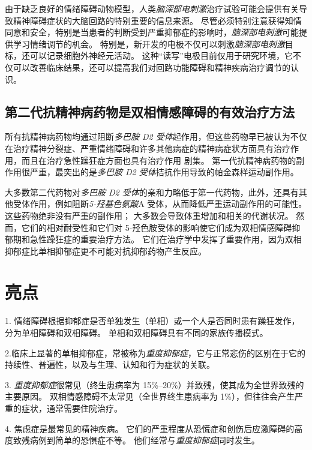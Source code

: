 由于缺乏良好的情绪障碍动物模型，人类\textit{脑深部电刺激}治疗试验可能会提供有关导致精神障碍症状的大脑回路的特别重要的信息来源。
尽管必须特别注意获得知情同意和安全，特别是当患者的判断受到严重抑郁症的影响时，\textit{脑深部电刺激}可能提供学习情绪调节的机会。
特别是，新开发的电极不仅可以刺激\textit{脑深部电刺激}目标，还可以记录细胞外神经元活动。
这种“读写”电极目前仅用于研究环境，它不仅可以改善临床结果，还可以提高我们对回路功能障碍和精神疾病治疗调节的认识。



\subsection{第二代抗精神病药物是双相情感障碍的有效治疗方法}

所有抗精神病药物均通过阻断\textit{多巴胺 D2 受体}起作用，但这些药物早已被认为不仅在治疗精神分裂症、严重情绪障碍和许多其他病症的精神病症状方面具有治疗作用，而且在治疗急性躁狂症方面也具有治疗作用 剧集。
第一代抗精神病药物的副作用很严重，最突出的是\textit{多巴胺 D2 受体}拮抗作用导致的帕金森样运动副作用。


大多数第二代药物对\textit{多巴胺 D2 受体}的亲和力略低于第一代药物，此外，还具有其他受体作用，例如阻断\textit{5-羟基色氨酸}A 受体，从而降低严重运动副作用的可能性。
这些药物绝非没有严重的副作用；
大多数会导致体重增加和相关的代谢状况。
然而，它们的相对耐受性和它们对 5-羟色胺受体的影响使它们成为双相情感障碍抑郁期和急性躁狂症的重要治疗方法。
它们在治疗学中发挥了重要作用，因为双相抑郁症比单相抑郁症更不可能对抗抑郁药物产生反应。



\section{亮点}

1. 情绪障碍根据抑郁症是否单独发生（单相）或一个人是否同时患有躁狂发作，分为单相障碍和双相障碍。
单相和双相障碍具有不同的家族传播模式。 


2.临床上显著的单相抑郁症，常被称为\textit{重度抑郁症}，它与正常悲伤的区别在于它的持续性、普遍性，以及与生理、认知和行为症状的关联。


3. \textit{重度抑郁症}很常见（终生患病率为 15\%–20\%）并致残，使其成为全世界致残的主要原因。
双相情感障碍不太常见（全世界终生患病率为 1\%），但往往会产生严重的症状，通常需要住院治疗。 


4. 焦虑症是最常见的精神疾病。
它们的严重程度从恐慌症和创伤后应激障碍的高度致残病例到简单的恐惧症不等。
他们经常与\textit{重度抑郁症}同时发生。


